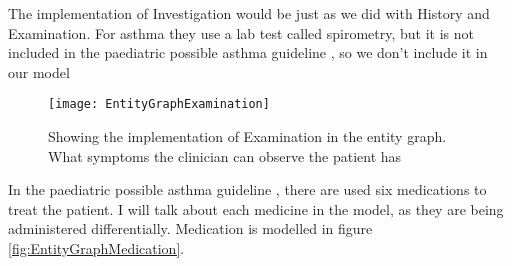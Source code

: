 The implementation of Investigation would be just as we did with History and Examination. For asthma they use a lab test called spirometry, but it is not included in the paediatric possible asthma guideline \parencite{RepublicofKeny2016}, so we don't include it in our model

\begin{figure}[h!]
	\caption {Showing the implementation of Examination in the entity graph. What symptoms the clinician can observe the patient has}
	\label{fig:EntityGraphExamination}
	\texttt{[image: EntityGraphExamination]}
\end{figure}

In the paediatric possible asthma guideline \parencite{RepublicofKeny2016}, there are used six medications to treat the patient. I will talk about each medicine in the model, as they are being administered differentially. Medication is modelled in figure \ref{fig:EntityGraphMedication}.


